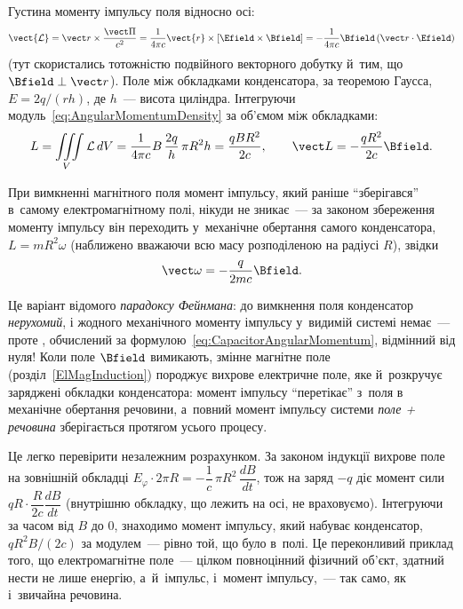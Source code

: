 Густина моменту імпульсу поля відносно осі:
\begin{equation}\label{eq:AngularMomentumDensity}
	\vect{\mathcal L} = \vect r\times\frac{\vect\Pi}{c^2} = \frac1{4\pi c}\vect{r}\times\left[\Efield\times\Bfield\right] = -\frac1{4\pi
		c}\Bfield\left(\vect r\cdot\Efield\right)
\end{equation}
(тут скористались тотожністю подвійного векторного добутку й~тим, що $\Bfield\perp\vect r$). Поле між обкладками конденсатора, за теоремою
Гаусса, $E = 2q/(rh)$, де $h$~--- висота циліндра. Інтегруючи модуль~\eqref{eq:AngularMomentumDensity} за об'ємом між обкладками:
\begin{equation}\label{eq:CapacitorAngularMomentum}
	L = \iiint\limits_V \mathcal L\, dV = \frac1{4\pi c}B\,\frac{2q}h\,\pi R^2 h = \frac{qBR^2}{2c}, \qquad \vect L = -\frac{qR^2}{2c}\Bfield.
\end{equation}

При вимкненні магнітного поля момент імпульсу, який раніше \enquote{зберігався} в~самому електромагнітному полі, нікуди не зникає~--- за законом
збереження моменту імпульсу він переходить у~механічне обертання самого конденсатора, $L = mR^2\omega$ (наближено вважаючи всю масу
розподіленою на радіусі $R$), звідки
\begin{equation}\label{eq:CapacitorOmega}
	\vect\omega = -\frac{q}{2mc}\Bfield.
\end{equation}

Це варіант відомого \emph{парадоксу Фейнмана}: до вимкнення поля конденсатор \emph{нерухомий}, і
жодного механічного моменту імпульсу у~видимій системі немає~--- проте , обчислений за
формулою~\eqref{eq:CapacitorAngularMomentum}, відмінний від нуля! Коли поле $\Bfield$ вимикають, змінне магнітне поле (розділ~\ref{ElMagInduction})
породжує вихрове електричне поле, яке й~розкручує заряджені обкладки конденсатора: момент імпульсу \enquote{перетікає} з~поля в
механічне обертання речовини, а~повний момент імпульсу системи \emph{поле + речовина} зберігається протягом усього процесу.

Це легко перевірити незалежним розрахунком. За законом індукції вихрове поле на зовнішній обкладці $E_\varphi\cdot2\pi R = -\dfrac1c\,\pi R^2\,\dfrac{dB}{dt}$,
тож на заряд $-q$ діє момент сили $qR\cdot\dfrac{R}{2c}\dfrac{dB}{dt}$ (внутрішню обкладку, що лежить на осі, не враховуємо). Інтегруючи за часом від
$B$ до $0$, знаходимо момент імпульсу, який набуває конденсатор, $qR^2B/(2c)$ за модулем~--- рівно той, що було в~полі. Це переконливий
приклад того, що електромагнітне поле~--- цілком повноцінний фізичний об'єкт, здатний нести не лише енергію, а~й~імпульс, і~момент імпульсу,~--- так само, як і~звичайна речовина.

